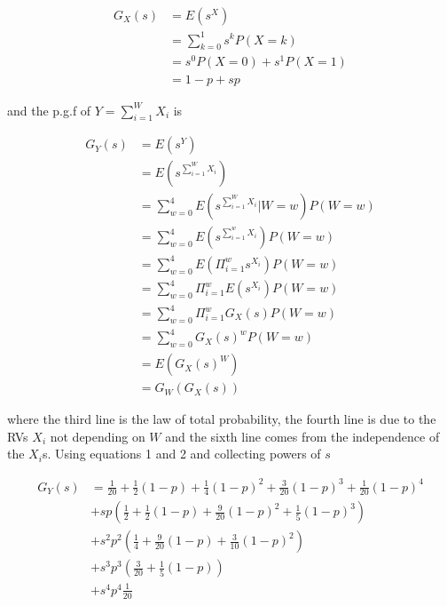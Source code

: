 \documentclass{article}
\begin{document}
\begin{flushleft}
\begin{equation} \label{eqn:bernpgf}
\begin{split}
G_X(s) & = E(s^X) \\
& = \sum_{k=0}^1 s^k P(X=k) \\
& = s^0 P(X=0) + s^1 P(X=1)\\
& = 1-p + sp
\end{split}
\end{equation}

and the p.g.f of $Y = \sum_{i=1}^W X_i$ is 

\begin{equation} \label{eq1}
\begin{split}
G_Y(s) & = E(s^Y) \\
& = E(s^{\sum_{i=1}^W X_i}) \\
& = \sum_{w=0}^4 E(s^{\sum_{i=1}^W X_i} | W=w) P(W=w) \\
& = \sum_{w=0}^4 E(s^{\sum_{i=1}^w X_i}) P(W=w) \\
& = \sum_{w=0}^4 E(\Pi_{i=1}^w s^{X_i}) P(W=w) \\
& = \sum_{w=0}^4 \Pi_{i=1}^w E(s^{X_i}) P(W=w) \\
& = \sum_{w=0}^4 \Pi_{i=1}^w G_X(s) P(W=w) \\
& = \sum_{w=0}^4 G_X(s)^w P(W=w) \\
& = E(G_X(s)^W) \\
& = G_W(G_X(s))
\end{split}
\end{equation}

where the third line is the law of total probability, the fourth line is due to the RVs $X_i$ not depending on $W$ and the sixth line comes from the independence of the $X_i$s. Using equations 1 and 2 and collecting powers of $s$

\begin{equation} \label{eqn:gy}
\begin{split}
G_Y(s) & = \frac{1}{20} + \frac{1}{2}(1-p) + \frac{1}{4}(1-p)^2 + \frac{3}{20}(1-p)^3 + \frac{1}{20}(1-p)^4 \\
& + sp(\frac{1}{2} + \frac{1}{2}(1-p) + \frac{9}{20}(1-p)^2 + \frac{1}{5}(1-p)^3) \\
& + s^2 p^2(\frac{1}{4} + \frac{9}{20}(1-p) + \frac{3}{10}(1-p)^2) \\
& + s^3 p^3(\frac{3}{20} + \frac{1}{5}(1-p)) \\
& + s^4 p^4 \frac{1}{20}
\end{split}
\end{equation}


\end{flushleft}
\end{document}
